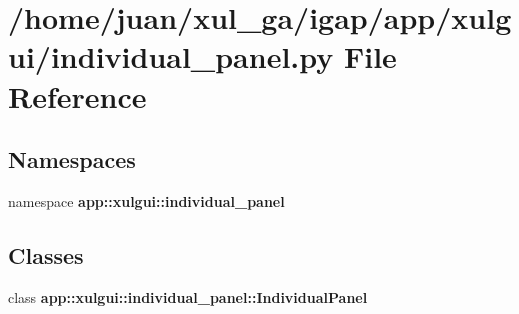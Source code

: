 \section{/home/juan/xul\_\-ga/igap/app/xulgui/individual\_\-panel.py File Reference}
\label{individual__panel_8py}
\subsection*{Namespaces}
\begin{CompactItemize}
\item 
namespace {\bf app::xulgui::individual\_\-panel}
\end{CompactItemize}
\subsection*{Classes}
\begin{CompactItemize}
\item 
class {\bf app::xulgui::individual\_\-panel::IndividualPanel}
\end{CompactItemize}
